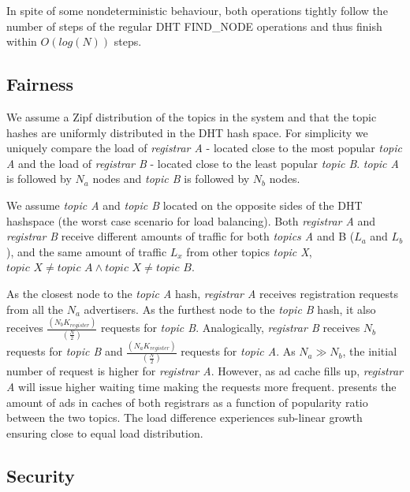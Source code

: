 In spite of some nondeterministic behaviour, both operations tightly follow the number of steps of the regular DHT FIND\_NODE operations and thus finish within $O(log(N))$ steps.

\subsection{Fairness}
We assume a Zipf distribution of the topics in the system and that the topic hashes are uniformly distributed in the DHT hash space. For simplicity we uniquely compare the load of \emph{registrar A} - located close to the most popular \emph{topic A} and the load of \emph{registrar B} - located close to the least popular \emph{topic B}. \emph{topic A} is followed by $N_a$ nodes and \emph{topic B} is followed by $N_b$ nodes. 

We assume \emph{topic A} and \emph{topic B} located on the opposite sides of the DHT hashspace (the worst case scenario for load balancing). Both \emph{registrar A} and \emph{registrar B} receive different amounts of traffic for both \emph{topics A} and {B} ($L_a$ and $L_b$), and the same amount of traffic $L_x$ from other topics \emph{topic X}, $\textit{topic X} \neq \textit{topic A} \land  \textit{topic X} \neq \textit{topic B}$. 

As the closest node to the \emph{topic A} hash, \emph{registrar A} receives registration requests from all the $N_a$ advertisers. As the furthest node to the \emph{topic B} hash, it also receives $\frac{(N_{b}K_\textit{register})}{(\frac{N}{2})}$ requests for \emph{topic B}. Analogically, \emph{registrar B} receives $N_b$ requests for \emph{topic B} and $\frac{(N_{a}K_\textit{register})}{(\frac{N}{2})}$ requests for \emph{topic A}. As $N_a \gg N_b$, the initial number of request is higher for \emph{registrar A}. However, as ad cache fills up, \emph{registrar A} will issue higher waiting time making the requests more frequent.  presents the amount of ads in caches of both registrars as a function of popularity ratio between the two topics. The load difference experiences sub-linear growth ensuring close to equal load distribution. 








\subsection{Security}